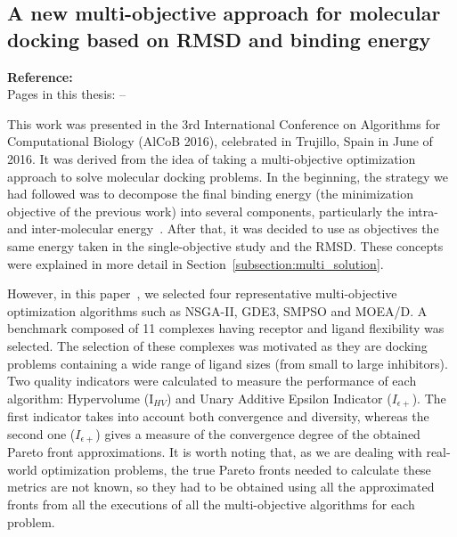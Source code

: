 \subsection{A new multi-objective approach for molecular docking based on RMSD and binding energy}

\textbf{Reference:}~\cite{LopezCamacho2016AlCoB} \\
Pages in this thesis: \pageref{start-pdf/alcob.pdf} -- \pageref{stop-pdf/alcob.pdf}

This work was presented in the 3rd International Conference on Algorithms for Computational Biology (AlCoB 2016), celebrated in Trujillo, Spain in June of 2016. It was derived from the idea of taking a multi-objective optimization approach to solve molecular docking problems. In the beginning, the strategy we had followed was to decompose the final binding energy (the minimization objective of the previous work) into several components, particularly the intra- and inter-molecular energy~\cite{Molecules2015}. After that, it was decided to use as objectives the same energy taken in the single-objective study and the RMSD. These concepts were explained in more detail in Section~\ref{subsection:multi_solution}.

However, in this paper~\cite{LopezCamacho2016AlCoB}, we selected four representative multi-objective optimization algorithms such as NSGA-II, GDE3, SMPSO and MOEA/D. A benchmark composed of 11 complexes having receptor and ligand flexibility was selected. The selection of these complexes was motivated as they are docking problems containing a wide range of ligand sizes (from small to large inhibitors). Two quality indicators were calculated to measure the performance of each algorithm: Hypervolume (I$_{HV}$) and Unary Additive Epsilon Indicator ($I_{\epsilon+}$). The first indicator takes into account both convergence and diversity, whereas the second one ($I_{\epsilon+}$) gives a measure of the convergence degree of the obtained Pareto front approximations. It is worth noting that, as we are dealing with real-world optimization problems, the true Pareto fronts needed to calculate these metrics are not known, so they had to be obtained using all the approximated fronts from all the executions of all the multi-objective algorithms for each problem.


